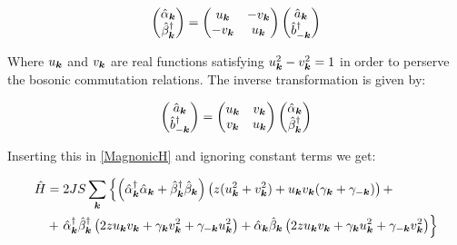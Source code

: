 \begin{equation}
\begin{pmatrix}
\hat{\alpha}_{\boldsymbol{k}} \\
\hat{\beta}_{\boldsymbol{k}}^\dagger
\end{pmatrix} = 
\begin{pmatrix}
u_{\boldsymbol{k}} & -v_{\boldsymbol{k}} \\
-v_{\boldsymbol{k}} & u_{\boldsymbol{k}}
\end{pmatrix}
\begin{pmatrix}
\hat{a}_{\boldsymbol{k}} \\
\hat{b}_{-\boldsymbol{k}}^\dagger
\end{pmatrix}
\end{equation}

Where $u_{\boldsymbol{k}}$ and $v_{\boldsymbol{k}}$ are real functions satisfying $u_{\boldsymbol{k}}^2-v_{\boldsymbol{k}}^2 = 1$ in order to perserve the bosonic commutation relations. The inverse transformation is given by:

\begin{equation}
\begin{pmatrix}
\hat{a}_{\boldsymbol{k}} \\
\hat{b}_{-\boldsymbol{k}}^\dagger
\end{pmatrix} = 
\begin{pmatrix}
u_{\boldsymbol{k}} & v_{\boldsymbol{k}} \\
v_{\boldsymbol{k}} & u_{\boldsymbol{k}}
\end{pmatrix}
\begin{pmatrix}
\hat{\alpha}_{\boldsymbol{k}} \\
\hat{\beta}_{\boldsymbol{k}}^\dagger
\end{pmatrix}
\end{equation}

Inserting this in \ref{MagnonicH} and ignoring constant terms we get:

\begin{align*}
\hat{H} &= 2JS \sum_{\boldsymbol{k}} \left\{ \left( \hat{\alpha}_{\boldsymbol{k}}^\dagger \hat{\alpha}_{\boldsymbol{k}} +\hat{\beta}_{\boldsymbol{k}}^\dagger \hat{\beta}_{\boldsymbol{k}} \right) \left( z(u_{\boldsymbol{k}}^2+v_{\boldsymbol{k}}^2) +u_{\boldsymbol{k}}v_{\boldsymbol{k}}( \gamma_{\boldsymbol{k}}+ \gamma_{-\boldsymbol{k}}) \right) + \right. \\
&+ \left.  \hat{\alpha}^\dagger_{\boldsymbol{k}} \hat{\beta}^\dagger_{\boldsymbol{k}} \left( 2zu_{\boldsymbol{k}}v_{\boldsymbol{k}} + \gamma_{\boldsymbol{k}}v_{\boldsymbol{k}}^2+\gamma_{-\boldsymbol{k}}u_{\boldsymbol{k}}^2 \right) + \hat{\alpha}_{\boldsymbol{k}}\hat{\beta}_{\boldsymbol{k}} \left( 2zu_{\boldsymbol{k}}v_{\boldsymbol{k}} + \gamma_{\boldsymbol{k}}u_{\boldsymbol{k}}^2+\gamma_{-\boldsymbol{k}}v_{\boldsymbol{k}}^2 \right) \right\}
\end{align*}

